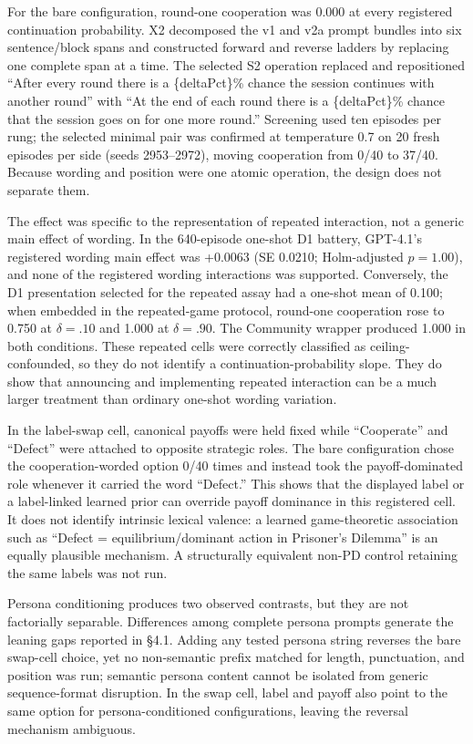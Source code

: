 \documentclass[
  11pt]{article}
\begin{document}
For the bare configuration, round-one cooperation was 0.000 at every
registered continuation probability. X2 decomposed the v1 and v2a prompt
bundles into six sentence/block spans and constructed forward and
reverse ladders by replacing one complete span at a time. The selected
S2 operation replaced and repositioned ``After every round there is a
\{deltaPct\}\% chance the session continues with another round'' with
``At the end of each round there is a \{deltaPct\}\% chance that the
session goes on for one more round.'' Screening used ten episodes per
rung; the selected minimal pair was confirmed at temperature 0.7 on 20
fresh episodes per side (seeds 2953--2972), moving cooperation from 0/40
to 37/40. Because wording and position were one atomic operation, the
design does not separate them.

The effect was specific to the representation of repeated interaction,
not a generic main effect of wording. In the 640-episode one-shot D1
battery, GPT-4.1's registered wording main effect was +0.0063
(SE 0.0210; Holm-adjusted $p=1.00$), and none of the registered wording
interactions was supported. Conversely, the D1 presentation selected for
the repeated assay had a one-shot mean of 0.100; when embedded in the
repeated-game protocol, round-one cooperation rose to 0.750 at
$\delta=.10$ and 1.000 at $\delta=.90$. The Community wrapper produced
1.000 in both conditions. These repeated cells were correctly classified
as ceiling-confounded, so they do not identify a continuation-probability
slope. They do show that announcing and implementing repeated interaction
can be a much larger treatment than ordinary one-shot wording variation.

In the label-swap cell, canonical payoffs were held fixed while
``Cooperate'' and ``Defect'' were attached to opposite strategic roles.
The bare configuration chose the cooperation-worded option 0/40 times
and instead took the payoff-dominated role whenever it carried the word
``Defect.'' This shows that the displayed label or a label-linked
learned prior can override payoff dominance in this registered cell. It
does not identify intrinsic lexical valence: a learned game-theoretic
association such as ``Defect = equilibrium/dominant action in Prisoner's
Dilemma'' is an equally plausible mechanism. A structurally equivalent
non-PD control retaining the same labels was not run.

Persona conditioning produces two observed contrasts, but they are not
factorially separable. Differences among complete persona prompts
generate the leaning gaps reported in §4.1. Adding any tested persona
string reverses the bare swap-cell choice, yet no non-semantic prefix
matched for length, punctuation, and position was run; semantic persona
content cannot be isolated from generic sequence-format disruption. In
the swap cell, label and payoff also point to the same option for
persona-conditioned configurations, leaving the reversal mechanism
ambiguous.
\end{document}
